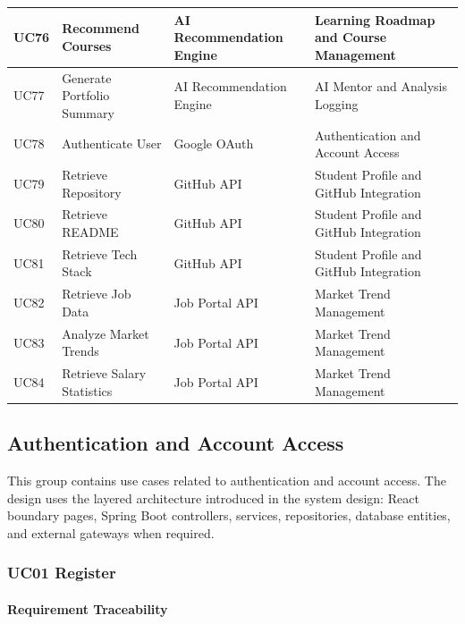 \begin{longtable}{|>{\centering\arraybackslash}m{0.8cm}|>{\raggedright\arraybackslash}m{3.0cm}|>{\raggedright\arraybackslash}m{2.4cm}|>{\raggedright\arraybackslash}m{4.8cm}|}
UC76 & Recommend Courses & AI Recommendation Engine & Learning Roadmap and Course Management \\
\hline

UC77 & Generate Portfolio Summary & AI Recommendation Engine & AI Mentor and Analysis Logging \\
\hline

UC78 & Authenticate User & Google OAuth & Authentication and Account Access \\
\hline

UC79 & Retrieve Repository & GitHub API & Student Profile and GitHub Integration \\
\hline

UC80 & Retrieve README & GitHub API & Student Profile and GitHub Integration \\
\hline

UC81 & Retrieve Tech Stack & GitHub API & Student Profile and GitHub Integration \\
\hline

UC82 & Retrieve Job Data & Job Portal API & Market Trend Management \\
\hline

UC83 & Analyze Market Trends & Job Portal API & Market Trend Management \\
\hline

UC84 & Retrieve Salary Statistics & Job Portal API & Market Trend Management \\
\hline

\end{longtable}
\normalsize
\setlength{\tabcolsep}{6pt}

\subsection{Authentication and Account Access}

This group contains use cases related to authentication and account access. The design uses the layered architecture introduced in the system design: React boundary pages, Spring Boot controllers, services, repositories, database entities, and external gateways when required.

\subsubsection{UC01 Register}

\paragraph{Requirement Traceability}

